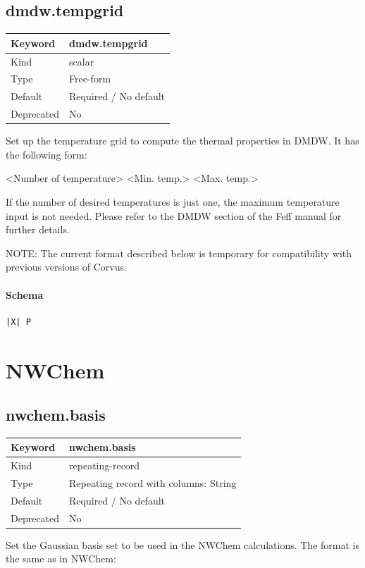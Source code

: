 \documentclass[11pt]{article}
\begin{document}
\subsection{dmdw.tempgrid}
\label{kw:dmdw-tempgrid}
\begin{longtable}{|p{1.5in}|p{4.5in}|}
\hline
Keyword & dmdw.tempgrid \\
\hline
Kind & scalar \\
\hline
Type & Free-form \\
\hline
Default & Required / No default \\
\hline
Deprecated & No \\
\hline
\end{longtable}
 Set up the temperature grid to compute the thermal properties in DMDW. It has
 the following form:

   <Number of temperature> <Min. temp.> <Max. temp.>

 If the number of desired temperatures is just one, the maximum temperature
 input is not needed. Please refer to the DMDW section of the Feff manual for
 further details.

 NOTE: The current format described below is temporary for compatibility with
 previous versions of Corvus.

\paragraph{Schema}
\begin{Verbatim}
|X| P
\end{Verbatim}

\section{NWChem}

\subsection{nwchem.basis}
\label{kw:nwchem-basis}
\begin{longtable}{|p{1.5in}|p{4.5in}|}
\hline
Keyword & nwchem.basis \\
\hline
Kind & repeating-record \\
\hline
Type & Repeating record with columns: String \\
\hline
Default & Required / No default \\
\hline
Deprecated & No \\
\hline
\end{longtable}
 Set the Gaussian basis set to be used in the NWChem calculations. The format
 is the same as in NWChem:
\end{document}

